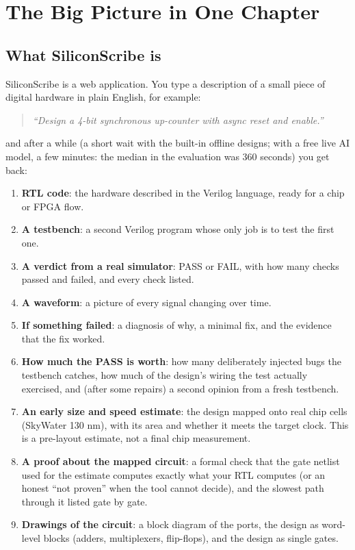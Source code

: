 
\chapter{The Big Picture in One Chapter}
\label{ch:bigpicture}

\section{What SiliconScribe is}

SiliconScribe is a web application. You type a description of a small piece of digital hardware in plain English, for example:

\begin{quote}\itshape
``Design a 4-bit synchronous up-counter with async reset and enable.''
\end{quote}

and after a while (a short wait with the built-in offline designs; with a free live AI model, a few minutes: the median in the evaluation was 360 seconds) you get back:

\begin{enumerate}
  \item \textbf{RTL code}: the hardware described in the Verilog language, ready for a chip or FPGA flow.
  \item \textbf{A testbench}: a second Verilog program whose only job is to test the first one.
  \item \textbf{A verdict from a real simulator}: PASS or FAIL, with how many checks passed and failed, and every check listed.
  \item \textbf{A waveform}: a picture of every signal changing over time.
  \item \textbf{If something failed}: a diagnosis of why, a minimal fix, and the evidence that the fix worked.
  \item \textbf{How much the PASS is worth}: how many deliberately injected bugs the testbench catches, how much of the design's wiring the test actually exercised, and (after some repairs) a second opinion from a fresh testbench.
  \item \textbf{An early size and speed estimate}: the design mapped onto real chip cells (SkyWater 130 nm), with its area and whether it meets the target clock. This is a pre-layout estimate, not a final chip measurement.
  \item \textbf{A proof about the mapped circuit}: a formal check that the gate netlist used for the estimate computes exactly what your RTL computes (or an honest ``not proven'' when the tool cannot decide), and the slowest path through it listed gate by gate.
  \item \textbf{Drawings of the circuit}: a block diagram of the ports, the design as word-level blocks (adders, multiplexers, flip-flops), and the design as single gates.
\end{enumerate}

